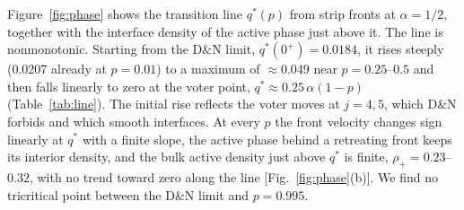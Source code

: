 \documentclass[pre,twocolumn,superscriptaddress,showpacs,floatfix]{revtex4-2}
\newcommand{\qs}{q^{*}}
\begin{document}
Figure~\ref{fig:phase} shows the transition line $\qs(p)$ from strip fronts at $\alpha = 1/2$,
together with the interface density of the active phase just above it. The line is nonmonotonic.
Starting from the D\&N limit, $\qs(0^+) = 0.0184$, it rises steeply (0.0207 already at $p = 0.01$)
to a maximum of $\approx 0.049$ near $p = 0.25$--$0.5$ and then falls linearly to zero at the voter
point, $\qs\approx 0.25\,\alpha(1-p)$ (Table~\ref{tab:line}). The initial rise reflects the voter
moves at $j = 4,5$, which D\&N forbids and which smooth interfaces. At every $p$ the front
velocity changes sign linearly at $\qs$ with a finite slope, the active phase behind a retreating
front keeps its interior density, and the bulk active density just above $\qs$ is finite,
$\rho_+ = 0.23$--$0.32$, with no trend toward zero along the line [Fig.~\ref{fig:phase}(b)]. We
find no tricritical point between the D\&N limit and $p = 0.995$.
\end{document}
